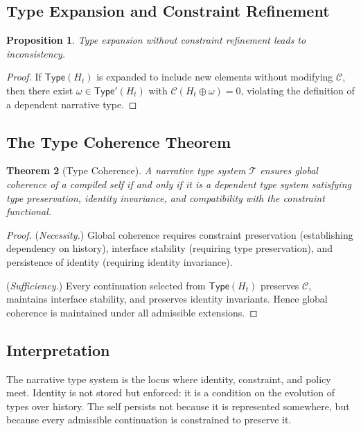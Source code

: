 \documentclass[12pt, a4paper]{article}
\theoremstyle{plain}
\newtheorem{theorem}{Theorem}[section]
\newtheorem{proposition}[theorem]{Proposition}
\theoremstyle{definition}
\theoremstyle{remark}
\begin{document}
\subsection{Type Expansion and Constraint Refinement}

\begin{proposition}
Type expansion without constraint refinement leads to inconsistency.
\end{proposition}

\begin{proof}
If $\mathsf{Type}(H_t)$ is expanded to include new elements without modifying $\mathcal{C}$, then there exist $\omega \in \mathsf{Type}'(H_t)$ with $\mathcal{C}(H_t \oplus \omega) = 0$, violating the definition of a dependent narrative type.
\end{proof}

\subsection{The Type Coherence Theorem}

\begin{theorem}[Type Coherence]
A narrative type system $\mathcal{T}$ ensures global coherence of a compiled self if and only if it is a dependent type system satisfying type preservation, identity invariance, and compatibility with the constraint functional.
\end{theorem}

\begin{proof}
(\textit{Necessity.}) Global coherence requires constraint preservation (establishing dependency on history), interface stability (requiring type preservation), and persistence of identity (requiring identity invariance).

(\textit{Sufficiency.}) Every continuation selected from $\mathsf{Type}(H_t)$ preserves $\mathcal{C}$, maintains interface stability, and preserves identity invariants. Hence global coherence is maintained under all admissible extensions.
\end{proof}

\subsection{Interpretation}

The narrative type system is the locus where identity, constraint, and policy meet. Identity is not stored but enforced: it is a condition on the evolution of types over history. The self persists not because it is represented somewhere, but because every admissible continuation is constrained to preserve it.
\end{document}
